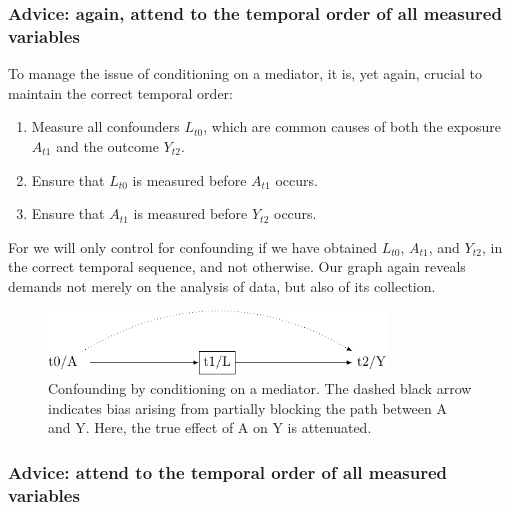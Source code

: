 \documentclass[
  singlecolumn,
  9pt]{article}
\providecommand{\tightlist}{%
  \setlength{\itemsep}{0pt}\setlength{\parskip}{0pt}}\usepackage{longtable,booktabs,array}
\begin{document}
\subsubsection{Advice: again, attend to the temporal order of all
measured
variables}\label{advice-again-attend-to-the-temporal-order-of-all-measured-variables-1}

To manage the issue of conditioning on a mediator, it is, yet again,
crucial to maintain the correct temporal order:

\begin{enumerate}
\def\labelenumi{\arabic{enumi}.}
\tightlist
\item
  Measure all confounders \(L_{t0}\), which are common causes of both
  the exposure \(A_{t1}\) and the outcome \(Y_{t2}\).
\item
  Ensure that \(L_{t0}\) is measured before \(A_{t1}\) occurs.
\item
  Ensure that \(A_{t1}\) is measured before \(Y_{t2}\) occurs.
\end{enumerate}

For we will only control for confounding if we have obtained \(L_{t0}\),
\(A_{t1}\), and \(Y_{t2}\), in the correct temporal sequence, and not
otherwise. Our graph again reveals demands not merely on the analysis of
data, but also of its collection.

\begin{figure}

{\centering \includegraphics[width=0.8\textwidth,height=\textheight]{causal-dags_files/figure-pdf/fig-dag-mediator-1.pdf}

}

\caption{\label{fig-dag-mediator}Confounding by conditioning on a
mediator. The dashed black arrow indicates bias arising from partially
blocking the path between A and Y. Here, the true effect of A on Y is
attenuated.}

\end{figure}

\subsubsection{Advice: attend to the temporal order of all measured
variables}\label{advice-attend-to-the-temporal-order-of-all-measured-variables-1}
\end{document}
